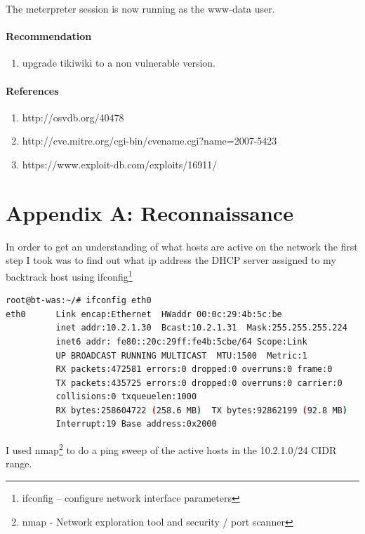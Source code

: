 \documentclass{article}
\begin{document}
The meterpreter session is now running as the www-data user.

\paragraph{Recommendation}

\begin{enumerate}
  \item upgrade tikiwiki to a non vulnerable version.
\end{enumerate}

\paragraph{References}

\begin{enumerate}
  \item http://osvdb.org/40478
	\item http://cve.mitre.org/cgi-bin/cvename.cgi?name=2007-5423
	\item https://www.exploit-db.com/exploits/16911/
\end{enumerate}

\newpage
\section{Appendix A: Reconnaissance}

In order to get an understanding of what hosts are active on the network the first step 
I took was to find out what ip address the DHCP server assigned to my backtrack host using 
ifconfig\footnote{\label{ifconfig}ifconfig -- configure network interface parameters} 

\begin{lstlisting}[language=Bash, firstline=1, lastline=3]
root@bt-was:~/# ifconfig eth0
eth0      Link encap:Ethernet  HWaddr 00:0c:29:4b:5c:be  
          inet addr:10.2.1.30  Bcast:10.2.1.31  Mask:255.255.255.224
          inet6 addr: fe80::20c:29ff:fe4b:5cbe/64 Scope:Link
          UP BROADCAST RUNNING MULTICAST  MTU:1500  Metric:1
          RX packets:472581 errors:0 dropped:0 overruns:0 frame:0
          TX packets:435725 errors:0 dropped:0 overruns:0 carrier:0
          collisions:0 txqueuelen:1000 
          RX bytes:258604722 (258.6 MB)  TX bytes:92862199 (92.8 MB)
          Interrupt:19 Base address:0x2000 
\end{lstlisting}

I used nmap\footnote{\label{nmap}nmap - Network exploration tool and security / port scanner} 
to do a ping sweep of the active hosts in the 
10.2.1.0/24 CIDR range.
\end{document}
